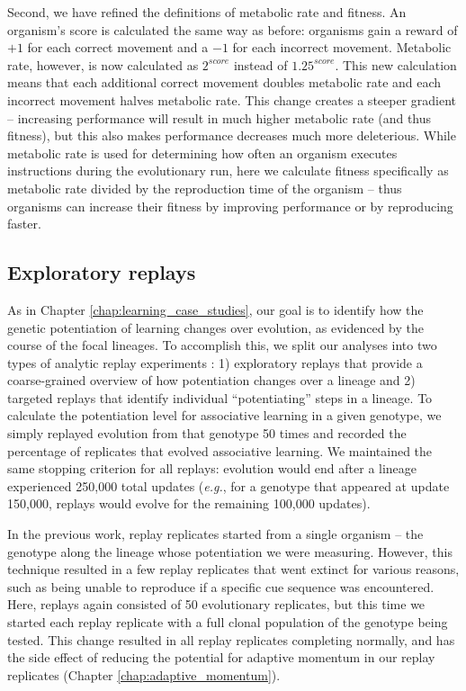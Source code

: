 Second, we have refined the definitions of metabolic rate and fitness.
An organism's score is calculated the same way as before: organisms gain a reward of $+1$ for each correct movement and a $-1$ for each incorrect movement. 
Metabolic rate, however, is now calculated as $2^{score}$ instead of $1.25^{score}$.
This new calculation means that each additional correct movement doubles metabolic rate and each incorrect movement halves metabolic rate. 
This change creates a steeper gradient -- increasing performance will result in much higher metabolic rate (and thus fitness), but this also makes performance decreases much more deleterious. 
While metabolic rate is used for determining how often an organism executes instructions during the evolutionary run, here we calculate fitness specifically as metabolic rate divided by the reproduction time of the organism -- thus organisms can increase their fitness by improving performance or by reproducing faster. 

\subsection{Exploratory replays}

As in Chapter \ref{chap:learning_case_studies}, our goal is to identify how the genetic potentiation of learning changes over evolution, as evidenced by the course of the focal lineages. 
To accomplish this, we split our analyses into two types of analytic replay experiments \citep{blountContingencyDeterminismEvolution2018}: 
1) exploratory replays that provide a coarse-grained overview of how potentiation changes over a lineage and 
2) targeted replays that identify individual ``potentiating'' steps in a lineage. 
To calculate the potentiation level for associative learning in a given genotype, we simply replayed evolution from that genotype 50 times and recorded the percentage of replicates that evolved associative learning. 
We maintained the same stopping criterion for all replays: evolution would end after a lineage experienced 250,000 total updates (\textit{e.g.}, for a genotype that appeared at update 150,000, replays would evolve for the remaining 100,000 updates). 

In the previous work, replay replicates started from a single organism -- the genotype along the lineage whose potentiation we were measuring. 
However, this technique resulted in a few replay replicates that went extinct for various reasons, such as being unable to reproduce if a specific cue sequence was encountered. 
Here, replays again consisted of 50 evolutionary replicates, but this time we started each replay replicate with a full clonal population of the genotype being tested. 
This change resulted in all replay replicates completing normally, and has the side effect of reducing the potential for adaptive momentum in our replay replicates (Chapter \ref{chap:adaptive_momentum}).

